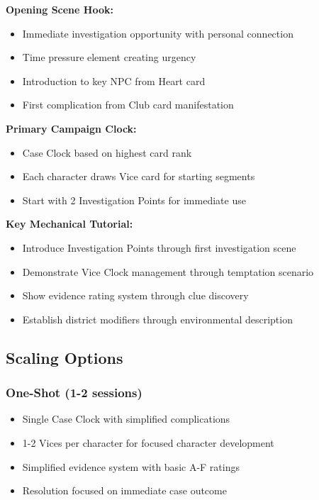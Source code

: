 \documentclass[11pt]{article}
\begin{document}
\textbf{Opening Scene Hook:}
\begin{itemize}
\item Immediate investigation opportunity with personal connection
\item Time pressure element creating urgency
\item Introduction to key NPC from Heart card
\item First complication from Club card manifestation
\end{itemize}

\textbf{Primary Campaign Clock:}
\begin{itemize}
\item Case Clock based on highest card rank
\item Each character draws Vice card for starting segments
\item Start with 2 Investigation Points for immediate use
\end{itemize}

\textbf{Key Mechanical Tutorial:}
\begin{itemize}
\item Introduce Investigation Points through first investigation scene
\item Demonstrate Vice Clock management through temptation scenario
\item Show evidence rating system through clue discovery
\item Establish district modifiers through environmental description
\end{itemize}

\subsection{Scaling Options}

\subsubsection{One-Shot (1-2 sessions)}

\begin{itemize}
\item Single Case Clock with simplified complications
\item 1-2 Vices per character for focused character development
\item Simplified evidence system with basic A-F ratings
\item Resolution focused on immediate case outcome
\end{itemize}
\end{document}
